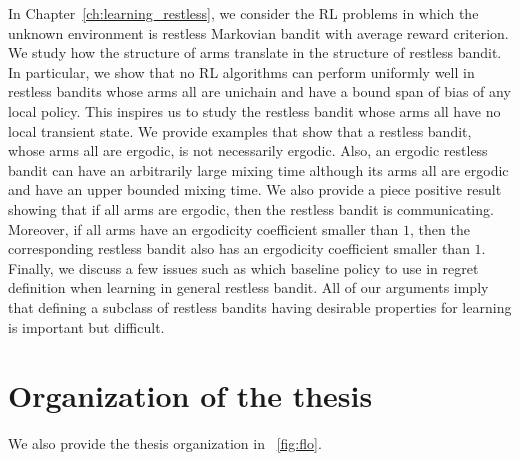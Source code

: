 In Chapter~\ref{ch:learning_restless}, we consider the RL problems in which the unknown environment is restless Markovian bandit with average reward criterion.
We study how the structure of arms translate in the structure of restless bandit.
In particular, we show that no RL algorithms can perform uniformly well in restless bandits whose arms all are unichain and have a bound span of bias of any local policy.
This inspires us to study the restless bandit whose arms all have no local transient state.
We provide examples that show that a restless bandit, whose arms all are ergodic, is not necessarily ergodic.
Also, an ergodic restless bandit can have an arbitrarily large mixing time although its arms all are ergodic and have an upper bounded mixing time.
We also provide a piece positive result showing that if all arms are ergodic, then the restless bandit is communicating.
Moreover, if all arms have an ergodicity coefficient smaller than $1$, then the corresponding restless bandit also has an ergodicity coefficient smaller than $1$.
Finally, we discuss a few issues such as which baseline policy to use in regret definition when learning in general restless bandit.
All of our arguments imply that defining a subclass of restless bandits having desirable properties for learning is important but difficult.

\section{Organization of the thesis}

We also provide the thesis organization in \figurename~\ref{fig:flo}.


